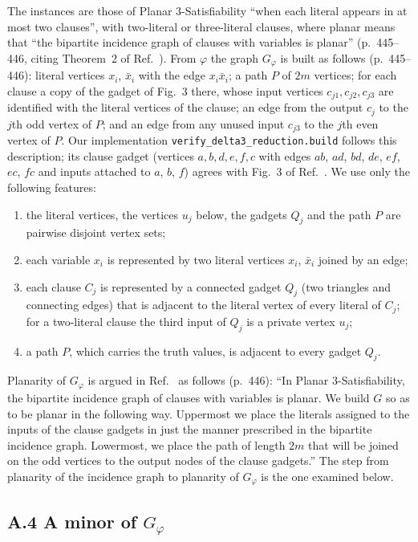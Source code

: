 \documentclass[aps,pre,onecolumn,superscriptaddress,nofootinbib]{revtex4-2}
\theoremstyle{remark}
\begin{document}
The instances are those of Planar 3-Satisfiability ``when each literal appears in at most two
clauses'', with two-literal or three-literal clauses, where planar means that ``the bipartite
incidence graph of clauses with variables is planar'' (p.~445--446, citing Theorem~2 of
Ref.~\cite{DarmannDockerDorn2018}). From $\varphi$ the graph $G_\varphi$ is built as follows
(p.~445--446): literal vertices $x_i$, $\bar x_i$ with the edge $x_i\bar x_i$; a path $P$ of $2m$
vertices; for each clause a copy of the gadget of Fig.~3 there, whose input vertices
$c_{j1},c_{j2},c_{j3}$ are identified with the literal vertices of the clause; an edge from the
output $c_j$ to the $j$th odd vertex of $P$; and an edge from any unused input $c_{j3}$ to the
$j$th even vertex of $P$. Our implementation \texttt{verify\_delta3\_reduction.build} follows this
description; its clause gadget (vertices $a,b,d,e,f,c$ with edges $ab$, $ad$, $bd$, $de$, $ef$, $ec$,
$fc$ and inputs attached to $a$, $b$, $f$) agrees with Fig.~3 of Ref.~\cite{Johnson2025}. We use
only the following features:
\begin{enumerate}
\item[(F0)] the literal vertices, the vertices $u_j$ below, the gadgets $Q_j$ and the path $P$ are
pairwise disjoint vertex sets;
\item[(F1)] each variable $x_i$ is represented by two literal vertices $x_i$, $\bar x_i$ joined by
an edge;
\item[(F2)] each clause $C_j$ is represented by a connected gadget $Q_j$ (two triangles and
connecting edges) that is adjacent to the literal vertex of every literal of $C_j$; for a
two-literal clause the third input of $Q_j$ is a private vertex $u_j$;
\item[(F3)] a path $P$, which carries the truth values, is adjacent to every gadget $Q_j$.
\end{enumerate}
Planarity of $G_\varphi$ is argued in Ref.~\cite{Johnson2025} as follows (p.~446): ``In Planar
3-Satisfiability, the bipartite incidence graph of clauses with variables is planar. We build $G$
so as to be planar in the following way. Uppermost we place the literals assigned to the inputs
of the clause gadgets in just the manner prescribed in the bipartite incidence graph. Lowermost,
we place the path of length $2m$ that will be joined on the odd vertices to the output nodes of the
clause gadgets.'' The step from planarity of the incidence graph to planarity of $G_\varphi$ is the
one examined below.

\subsection*{A.4 A minor of $G_\varphi$}
\end{document}

